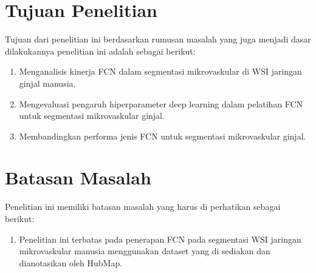 \section{Tujuan Penelitian}

\noindent Tujuan dari penelitian ini berdasarkan rumusan masalah yang juga menjadi dasar dilakukannya penelitian ini adalah sebagai berikut:
\begin{enumerate}
    \item Menganalisis kinerja FCN dalam segmentasi mikrovaskular di WSI jaringan ginjal manusia.
    \item Mengevaluasi pengaruh hiperparameter deep learning dalam pelatihan FCN untuk segmentasi mikrovaskular ginjal.
    \item Membandingkan performa jenis FCN untuk segmentasi mikrovaskular ginjal.
\end{enumerate}

\section{Batasan Masalah}
\noindent Penelitian ini memiliki batasan masalah yang harus di perhatikan sebagai berikut:
\begin{enumerate}
	\item Penelitian ini terbatas pada penerapan FCN pada segmentasi WSI jaringan mikrovaskular manusia menggunakan dataset yang di sediakan dan dianotasikan oleh HubMap.
\end{enumerate}

